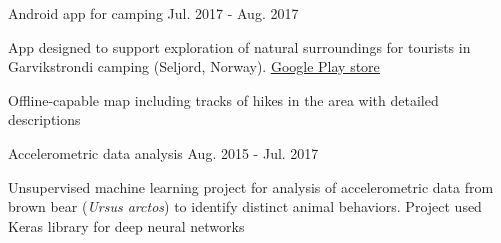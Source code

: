 \begin{cventries}
  \cventry
    {} %
    {Android app for camping} %
    {} %
    {Jul. 2017 - Aug. 2017} %
    {
      \begin{cvitems} %
      	\item {App designed to support exploration of natural surroundings for tourists in Garvikstrondi camping (Seljord, Norway). \underline{\href{https://play.google.com/store/apps/details?id=sk.malobysa.www.garvikstronditur&hl=en}{Google Play store}}}
      	\item {Offline-capable map including tracks of hikes in the area with detailed descriptions}
      \end{cvitems}
    }
    
  \cventry
    {} %
    {Accelerometric data analysis} %
    {} %
    {Aug. 2015 - Jul. 2017} %
    {
      \begin{cvitems} %
      	\item {Unsupervised machine learning project for analysis of accelerometric data from brown bear (\textit{Ursus arctos}) to identify distinct animal behaviors. Project used Keras library for deep neural networks}
      \end{cvitems}
    }
\end{cventries}
